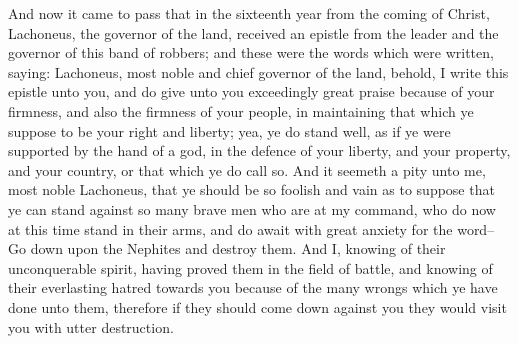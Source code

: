 \bchapter
\bverse \iffalse And now it came to pass that in the sixteenth year from the coming of Christ, Lachoneus, the governor of the land, received an epistle from the leader and the governor of this band of robbers; and these were the words which were written, saying: \fi
And now it came to pass that in the sixteenth year from the coming of Christ, Lachoneus, the governor of the land, received an epistle from the leader and the governor of this band of robbers; and these were the words which were written, saying:
\bverse \iffalse Lachoneus, most noble and chief governor of the land, behold, I write this epistle unto you, and do give unto you exceedingly great praise because of your firmness, and also the firmness of your people, in maintaining that which ye suppose to be your right and liberty; yea, ye do stand well, as if ye were supported by the hand of a god, in the defence of your liberty, and your property, and your country, or that which ye do call so. \fi
Lachoneus, most noble and chief governor of the land, behold, I write this epistle unto you, and do give unto you exceedingly great praise because of your firmness, and also the firmness of your people, in maintaining that which ye suppose to be your right and liberty; yea, ye do stand well, as if ye were supported by the hand of a god, in the defence of your liberty, and your property, and your country, or that which ye do call so.
\bverse \iffalse And it seemeth a pity unto me, most noble Lachoneus, that ye should be so foolish and vain as to suppose that ye can stand against so many brave men who are at my command, who do now at this time stand in their arms, and do await with great anxiety for the word--Go down upon the Nephites and destroy them. \fi
And it seemeth a pity unto me, most noble Lachoneus, that ye should be so foolish and vain as to suppose that ye can stand against so many brave men who are at my command, who do now at this time stand in their arms, and do await with great anxiety for the word--Go down upon the Nephites and destroy them.
\bverse \iffalse And I, knowing of their unconquerable spirit, having proved them in the field of battle, and knowing of their everlasting hatred towards you because of the many wrongs which ye have done unto them, therefore if they should come down against you they would visit you with utter destruction. \fi
And I, knowing of their unconquerable spirit, having proved them in the field of battle, and knowing of their everlasting hatred towards you because of the many wrongs which ye have done unto them, therefore if they should come down against you they would visit you with utter destruction.
